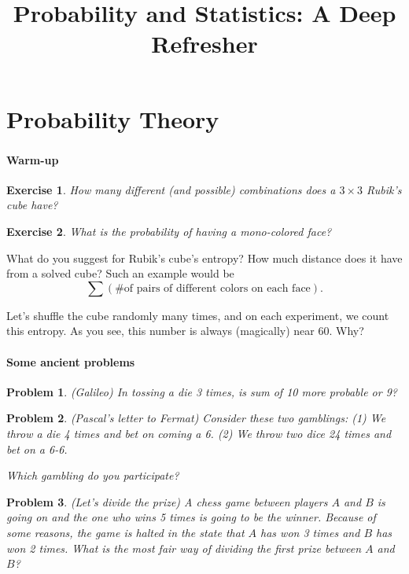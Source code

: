 \documentclass{article}
\title{Probability and Statistics: A Deep Refresher}
\newtheorem{exc}{Exercise}
\newtheorem{prb}{Problem}
\begin{document}
\maketitle
\tableofcontents
\part{Probability Theory}
\section{}

\subsection{Warm-up}
\begin{exc}
  How many different (and possible) combinations does a $3\times 3$ Rubik's cube have?
\end{exc}
\begin{exc}
  What is the probability of having a mono-colored face?
\end{exc}

What do you suggest for Rubik's cube's entropy? How much distance does it have from a solved cube?
Such an example would be 
\[ \sum (\mbox{\# of pairs of different colors on each face}). \]

Let's shuffle the cube randomly many times, and on each experiment, we count this entropy. As you see, this number is always (magically) near 60. Why?

\subsection{Some ancient problems}
\begin{prb} (Galileo)
  In tossing a die 3 times, is sum of 10 more probable or 9?
\end{prb}

\begin{prb}
  (Pascal's letter to Fermat) Consider these two gamblings: (1) We throw a die 4 times and bet on coming a 6. (2) We throw two dice 24 times and bet on a 6-6.

  Which gambling do you participate?
\end{prb}

\begin{prb}
  (Let's divide the prize) A chess game between players $A$ and $B$ is going on and the one who wins 5 times is going to be the winner. Because of some reasons, the game is halted in the state that $A$ has won 3 times and $B$ has won 2 times. What is the most fair way of dividing the first prize between $A$ and $B$?
\end{prb}
\end{document}
